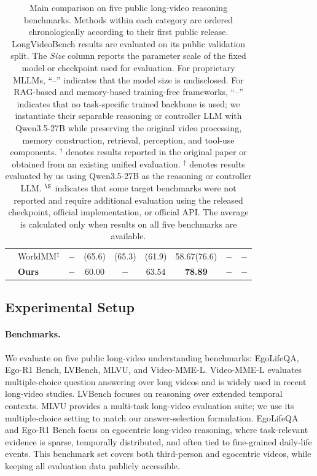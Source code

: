 \documentclass[letterpaper]{article} %
\begin{document}
\begin{table}[t]
{\begin{tabular}{llccccccc}
& WorldMM$^{\ddagger}$
& $-$ & (65.6) & (65.3) & (61.9) &  58.67(76.6) & $-$ & $-$ \\


\addlinespace[2pt]
& \textbf{Ours}
& $-$ & 60.00 & $-$ & 63.54 & \textbf{78.89} & $-$ & $-$ \\

\bottomrule
\end{tabular}%
}
\caption{
Main comparison on five public long-video reasoning benchmarks.
Methods within each category are ordered chronologically according to their
first public release.
LongVideoBench results are evaluated on its public validation split.
The \emph{Size} column reports the parameter scale of the fixed model or
checkpoint used for evaluation.
For proprietary MLLMs, ``--'' indicates that the model size is undisclosed.
For RAG-based and memory-based training-free frameworks, ``--'' indicates that
no task-specific trained backbone is used; we instantiate their separable
reasoning or controller LLM with Qwen3.5-27B while preserving the original
video processing, memory construction, retrieval, perception, and tool-use
components.
$^{\dagger}$ denotes results reported in the original paper or obtained from
an existing unified evaluation.
$^{\ddagger}$ denotes results evaluated by us using Qwen3.5-27B as the
reasoning or controller LLM.
$^{\S}$ indicates that some target benchmarks were not reported and require
additional evaluation using the released checkpoint, official implementation,
or official API.
The average is calculated only when results on all five benchmarks are available.
}
\label{tab:main_results}
\end{table}


\subsection{Experimental Setup}

\paragraph{Benchmarks.}
We evaluate on five public long-video understanding benchmarks: EgoLifeQA, Ego-R1 Bench, LVBench, MLVU, and Video-MME-L. Video-MME-L evaluates multiple-choice question answering over long videos and is widely used in recent long-video studies. LVBench focuses on reasoning over extended temporal contexts. MLVU provides a multi-task long-video evaluation suite; we use its multiple-choice setting to match our answer-selection formulation. EgoLifeQA and Ego-R1 Bench focus on egocentric long-video reasoning, where task-relevant evidence is sparse, temporally distributed, and often tied to fine-grained daily-life events. This benchmark set covers both third-person and egocentric videos, while keeping all evaluation data publicly accessible.
\end{document}
